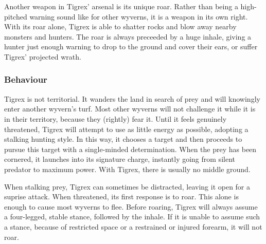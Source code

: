 Another weapon in Tigrex' arsenal is its unique roar. Rather than being a high-pitched warning sound like for other wyverns, it is a weapon in its own right. With its roar alone, Tigrex is able to shatter rocks and blow away nearby monsters and hunters. The roar is always preceeded by a huge inhale, giving a hunter just enough warning to drop to the ground and cover their ears, or suffer Tigrex' projected wrath.

\subsubsection{Behaviour}
Tigrex is not territorial. It wanders the land in search of prey and will knowingly enter another wyvern's turf. Most other wyverns will not challenge it while it is in their territory, because they (rightly) fear it. Until it feels genuinely threatened, Tigrex will attempt to use as little energy as possible, adopting a stalking hunting style. In this way, it chooses a target and then proceeds to pursue this target with a single-minded determination. When the prey has been cornered, it launches into its signature charge, instantly going from silent predator to maximum power. With Tigrex, there is usually no middle ground.

When stalking prey, Tigrex can sometimes be distracted, leaving it open for a suprise attack. When threatened, its first response is to roar. This alone is enough to cause most wyverns to flee. Before roaring, Tigrex will always assume a four-legged, stable stance, followed by the inhale. If it is unable to assume such a stance, because of restricted space or a restrained or injured forearm, it will not roar.

